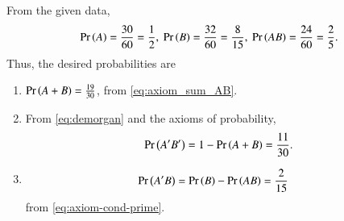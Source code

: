     From the given data, 
    \begin{align}
        \pr{A} = \frac{30}{60} = \frac{1}{2},\ 
        \pr{B} = \frac{32}{60} = \frac{8}{15},\ 
        \pr{AB}= \frac{24}{60} = \frac{2}{5}.
    \end{align}
    Thus, the desired probabilities are
\begin{enumerate}
	\item $\Pr\left(A+B\right)=\frac{19}{30}$, from 
\eqref{eq:axiom_sum_AB}.
	\item From
	\eqref{eq:demorgan}
	and the axioms of probability,
        \begin{align}
\Pr\left(A^\prime  B^\prime \right) =1-\Pr\left(A+B\right)= \frac{11}{30}.
\end{align}
	\item     
		\begin{align}
	    \Pr\left(A^\prime B\right)        &= \Pr\left(B\right) - \Pr\left(AB\right) = \frac{2}{15} 
    \end{align}
    from
\eqref{eq:axiom-cond-prime}.
\end{enumerate}
